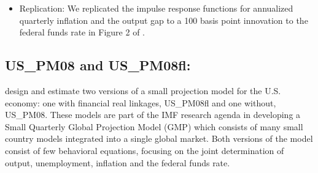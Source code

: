 \documentclass[11pt,a4paper]{article}
\begin{document}
\begin{itemize}
		\item Replication: We replicated the impulse response functions for annualized quarterly inflation and the output gap to a 100 basis point innovation to the federal funds rate in Figure 2 of \cite{LevinWielandWilliams2003}.
		
		
	\end{itemize}
	
	
	
	
	\subsection{US\_PM08 and US\_PM08fl: \cite{Carabenciovetal2008}}
	\label{USPM08}
	\label{USPM08fl}
	
	\cite{Carabenciovetal2008} design and estimate two versions of a small projection model for the U.S. economy: one with financial real linkages, US\_PM08fl and one without, US\_PM08. These models are part of the IMF research agenda in developing a Small Quarterly Global Projection Model (GMP) which consists of many small country models integrated into a single global market. Both versions of the model consist of few behavioral equations, focusing on the joint determination of output, unemployment, inflation and the federal funds rate.
	
\end{document}

